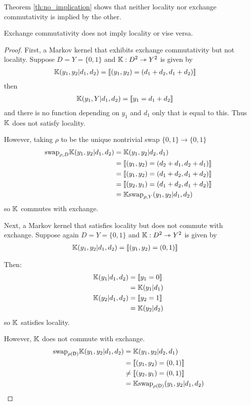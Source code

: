 Theorem \ref{th:no_implication} shows that neither locality nor exchange commutativity is implied by the other.

\begin{theorem}\label{th:no_implication}
Exchange commutativity does not imply locality or vise versa.
\end{theorem}

\begin{proof}
First, a Markov kernel that exhibits exchange commutativity but not locality. Suppose $D=Y=\{0,1\}$ and $\mathbb{K}:D^2\rightarrowtriangle Y^2$ is given by
\begin{align}
    \mathbb{K}(y_1,y_2|d_1,d_2) &= \llbracket (y_1,y_2)= (d_1+d_2,d_1+d_2) \rrbracket
\end{align}
then 
\begin{align}
    \mathbb{K}(y_1,Y|d_1,d_2) &= \llbracket y_1 = d_1+d_2 \rrbracket
\end{align}
and there is no function depending on $y_1$ and $d_1$ only that is equal to this. Thus $\mathbb{K}$ does not satisfy locality. 

However, taking $\rho$ to be the unique nontrivial swap $\{0,1\}\to \{0,1\}$
\begin{align}
    \text{swap}_{\rho,D}\mathbb{K}(y_1,y_2|d_1,d_2) &= \mathbb{K}(y_1,y_2|d_2,d_1)\\
    &= \llbracket (y_1,y_2)= (d_2+d_1,d_2+d_1) \rrbracket\\
    &= \llbracket (y_1,y_2)= (d_1+d_2,d_1+d_2) \rrbracket\\
    &= \llbracket (y_2,y_1)= (d_1+d_2,d_1+d_2) \rrbracket\\
    &= \mathbb{K}\text{swap}_{\rho,Y}(y_1,y_2|d_1,d_2)
\end{align}
so $\mathbb{K}$ commutes with exchange.

Next, a Markov kernel that satisfies locality but does not commute with exchange. Suppose again $D=Y=\{0,1\}$ and $\mathbb{K}:D^2\rightarrowtriangle Y^2$ is given by
\begin{align}
    \mathbb{K}(y_1,y_2|d_1,d_2) &= \llbracket (y_1,y_2)= (0,1) \rrbracket
\end{align}

Then:
\begin{align}
    \mathbb{K}(y_1|d_1,d_2) &= \llbracket y_1= 0 \rrbracket\\
    &= \mathbb{K}(y_1|d_1)\\
    \mathbb{K}(y_2|d_1,d_2)&= \llbracket y_2= 1 \rrbracket\\
    &= \mathbb{K}(y_2|d_2)
\end{align}
so $\mathbb{K}$ satisfies locality.

However, $\mathbb{K}$ does not commute with exchange.
\begin{align}
    \text{swap}_{\rho(\mathsf{D})} \mathbb{K}(y_1,y_2|d_1,d_2) &= \mathbb{K}(y_1,y_2|d_2,d_1)\\
    &=\llbracket (y_1,y_2)= (0,1) \rrbracket\\
    &\neq \llbracket (y_2,y_1)= (0,1) \rrbracket\\
    &= \mathbb{K}\text{swap}_{\rho(\mathsf{D})}(y_1,y_2|d_1,d_2)
\end{align}
\end{proof}

